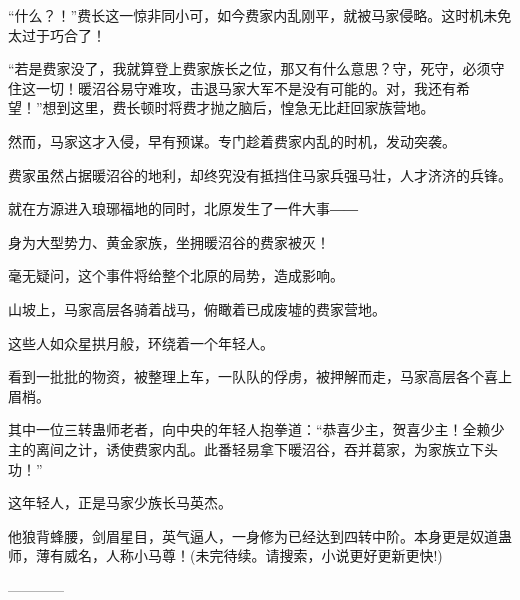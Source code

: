 \begin{this_body}
“什么？！”费长这一惊非同小可，如今费家内乱刚平，就被马家侵略。这时机未免太过于巧合了！

“若是费家没了，我就算登上费家族长之位，那又有什么意思？守，死守，必须守住这一切！暖沼谷易守难攻，击退马家大军不是没有可能的。对，我还有希望！”想到这里，费长顿时将费才抛之脑后，惶急无比赶回家族营地。

然而，马家这才入侵，早有预谋。专门趁着费家内乱的时机，发动突袭。

费家虽然占据暖沼谷的地利，却终究没有抵挡住马家兵强马壮，人才济济的兵锋。

就在方源进入琅琊福地的同时，北原发生了一件大事――

身为大型势力、黄金家族，坐拥暖沼谷的费家被灭！

毫无疑问，这个事件将给整个北原的局势，造成影响。

山坡上，马家高层各骑着战马，俯瞰着已成废墟的费家营地。

这些人如众星拱月般，环绕着一个年轻人。

看到一批批的物资，被整理上车，一队队的俘虏，被押解而走，马家高层各个喜上眉梢。

其中一位三转蛊师老者，向中央的年轻人抱拳道：“恭喜少主，贺喜少主！全赖少主的离间之计，诱使费家内乱。此番轻易拿下暖沼谷，吞并葛家，为家族立下头功！”

这年轻人，正是马家少族长马英杰。

他狼背蜂腰，剑眉星目，英气逼人，一身修为已经达到四转中阶。本身更是奴道蛊师，薄有威名，人称小马尊！(未完待续。请搜索，小说更好更新更快!)

------------

\end{this_body}

